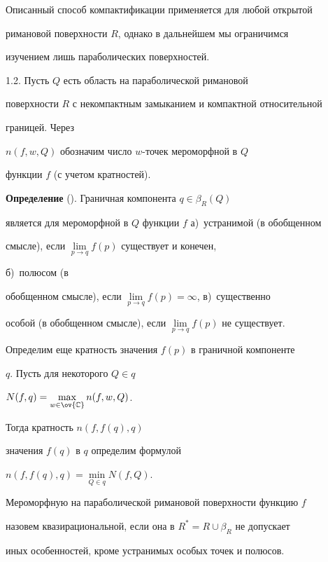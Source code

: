 Описанный способ компактификации применяется для любой открытой


римановой поверхности $R$, однако в дальнейшем мы ограничимся


изучением лишь параболических поверхностей.





1.2. Пусть $Q$ есть область на параболической римановой


поверхности $R$ с некомпактным замыканием и компактной относительной


границей. Через


$n(f, w, Q)$ обозначим число $w$-точек мероморфной в $Q$


функции $f$ (с учетом кратностей).


\medskip





{\bf Определение} (\cite{Myr}). Граничная компонента $q\in \beta_R(Q)$


является для мероморфной в $Q$ функции $f$ а)~устранимой (в обобщенном


смысле), если $\lim\limits_{p\to q}f(p)$ существует и конечен,


б)~полюсом (в


обобщенном смысле), если $\lim\limits_{p\to q}f(p)=\infty$, в)~существенно


особой (в обобщенном смысле), если $\lim\limits_{p\to q}f(p)$ не существует.


\medskip





Определим еще кратность значения $f(p)$ в граничной компоненте


$q$. Пусть для некоторого $Q\in q$\;


$N(f,q)=\max\limits_{w\in \ov{\Bbb C}} n(f, w, Q)$.


Тогда кратность $n(f, f(q), q)$


значения $f(q)$ в $q$ определим формулой


$n(f, f(q),q)=\min\limits_{Q\in q}N(f, Q)$.


Мероморфную на параболической римановой поверхности функцию $f$


назовем квазирациональной, если она в $R^*=R\cup \beta_R$ не допускает


иных особенностей, кроме устранимых особых точек и полюсов.


\medskip





